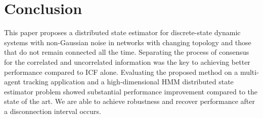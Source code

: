 \documentclass[conference]{IEEEtran}
\theoremstyle{remark}
\begin{document}
\section{Conclusion} \label{sec:conclusion}
This paper proposes a distributed state estimator for discrete-state dynamic systems with non-Gaussian noise in networks with changing topology and those that do not remain connected all the time. Separating the process of consensus for the correlated and uncorrelated information was the key to achieving better performance compared to ICF alone. Evaluating the proposed method on a multi-agent tracking application and a high-dimensional HMM distributed state estimator problem showed substantial performance improvement compared to the state of the art. We are able to achieve robustness and recover performance after a disconnection interval occurs. 

\balance

\end{document}
